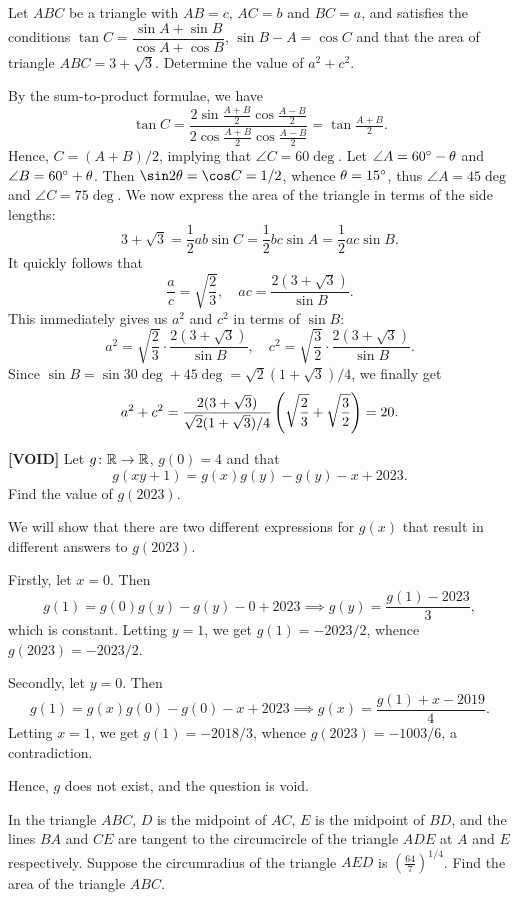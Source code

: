 \begin{question}[20]\label{A::2023-O-1-19}
    Let $ABC$ be a triangle with $AB = c$, $AC = b$ and $BC = a$, and satisfies the conditions $\tan C = \dfrac{\sin A + \sin B}{\cos A + \cos B}$, $\sin{B - A} = \cos C$ and that the area of triangle $ABC = 3 + \sqrt{3}$. Determine the value of $a^2 + c^2$.
\end{question}

By the sum-to-product formulae, we have \[\tan C = \frac{2\sin{\frac{A+B}{2}} \cos{\frac{A-B}{2}}}{2\cos{\frac{A+B}{2}} \cos{\frac{A-B}{2}}} = \tan{\tfrac{A+B}{2}}.\] Hence, $C = (A+B)/2$, implying that $\angle C = 60\deg$. Let $\angle A = 60^{\circ} - \theta$ and $\angle B = 60^{\circ} + \theta$. Then $\sin 2\t = \cos C = 1/2$, whence $\theta = 15^{\circ}$, thus $\angle A = 45\deg$ and $\angle C = 75\deg$. We now express the area of the triangle in terms of the side lengths: \[3 + \sqrt{3} = \frac12 ab \sin C = \frac12 bc \sin A = \frac12 ac \sin B.\] It quickly follows that \[\frac{a}{c} = \sqrt{\frac23}, \quad ac = \frac{2(3 + \sqrt3)}{\sin B}.\] This immediately gives us $a^2$ and $c^2$ in terms of $\sin B$: \[a^2 = \sqrt{\frac23} \cdot \frac{2(3 + \sqrt3)}{\sin B}, \quad c^2 = \sqrt{\frac32} \cdot \frac{2(3 + \sqrt3)}{\sin B}.\] Since $\sin B = \sin{30\deg + 45\deg} = \sqrt{2}(1 + \sqrt3)/4$, we finally get \[a^2 + c^2 = \frac{2(3 + \sqrt3)}{\sqrt{2}(1 + \sqrt3)/4} \left( \sqrt{\frac23} + \sqrt{\frac32} \right) = 20.\]
    
\begin{question}\label{A::2023-O-1-20}
    \textbf{[VOID]} Let $g \colon \mathbb{R} \to \mathbb{R}$, $g(0) = 4$ and that \[g(xy + 1) = g(x)g(y) - g(y) - x + 2023.\] Find the value of $g(2023)$.
\end{question}

We will show that there are two different expressions for $g(x)$ that result in different answers to $g(2023)$.

Firstly, let $x = 0$. Then \[g(1) = g(0)g(y) - g(y) - 0 + 2023 \implies g(y) = \frac{g(1) - 2023}{3},\] which is constant. Letting $y = 1$, we get $g(1) = -2023/2$, whence $g(2023) = -2023/2$.

Secondly, let $y = 0$. Then \[g(1) = g(x)g(0) - g(0) - x + 2023 \implies g(x) = \frac{g(1) + x - 2019}{4}.\] Letting $x = 1$, we get $g(1) = -2018/3$, whence $g(2023) = -1003/6$, a contradiction.

Hence, $g$ does not exist, and the question is void.

\begin{question}[7]\label{A::2023-O-1-21}
    In the triangle $ABC$, $D$ is the midpoint of $AC$, $E$ is the midpoint of $BD$, and the lines $BA$ and $CE$ are tangent to the circumcircle of the triangle $ADE$ at $A$ and $E$ respectively. Suppose the circumradius of the triangle $AED$ is $(\frac{64}{7})^{1/4}$. Find the area of the triangle $ABC$.
\end{question}

